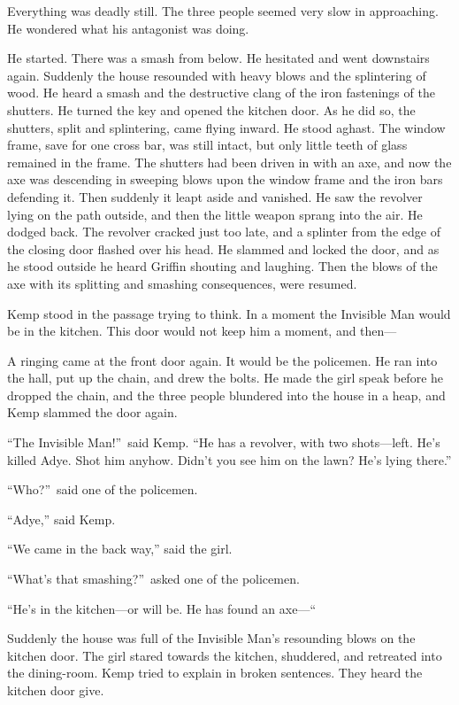 Everything was deadly still. The three people seemed very slow in approaching. He wondered what his antagonist was doing.

He started. There was a smash from below. He hesitated and went downstairs again. Suddenly the house resounded with heavy blows and the splintering of wood. He heard a smash and the destructive clang of the iron fastenings of the shutters. He turned the key and opened the kitchen door. As he did so, the shutters, split and splintering, came flying inward. He stood aghast. The window frame, save for one cross bar, was still intact, but only little teeth of glass remained in the frame. The shutters had been driven in with an axe, and now the axe was descending in sweeping blows upon the window frame and the iron bars defending it. Then suddenly it leapt aside and vanished. He saw the revolver lying on the path outside, and then the little weapon sprang into the air. He dodged back. The revolver cracked just too late, and a splinter from the edge of the closing door flashed over his head. He slammed and locked the door, and as he stood outside he heard Griffin shouting and laughing. Then the blows of the axe with its splitting and smashing consequences, were resumed.

Kemp stood in the passage trying to think. In a moment the Invisible Man would be in the kitchen. This door would not keep him a moment, and then—

A ringing came at the front door again. It would be the policemen. He ran into the hall, put up the chain, and drew the bolts. He made the girl speak before he dropped the chain, and the three people blundered into the house in a heap, and Kemp slammed the door again.

“The Invisible Man!”\ said Kemp. “He has a revolver, with two shots—left. He’s killed Adye. Shot him anyhow. Didn’t you see him on the lawn? He’s lying there.”

“Who?”\ said one of the policemen.

“Adye,” said Kemp.

“We came in the back way,” said the girl.

“What’s that smashing?”\ asked one of the policemen.

“He’s in the kitchen—or will be. He has found an axe—“

Suddenly the house was full of the Invisible Man’s resounding blows on the kitchen door. The girl stared towards the kitchen, shuddered, and retreated into the dining-room. Kemp tried to explain in broken sentences. They heard the kitchen door give.


